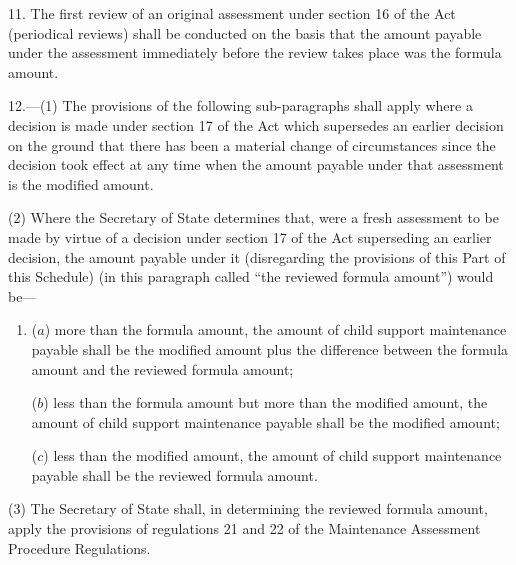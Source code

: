 \documentclass[12pt,a4paper]{article}
\begin{document}

\medskip

11.  The first review of an original assessment under section 16 of the Act (periodical reviews) shall be conducted on the basis that the amount payable under the assessment immediately before the review takes place was the formula amount.

\medskip

12.—(1) The provisions of the following sub-paragraphs shall apply where 
a decision is made under section 17 of the Act which supersedes an earlier decision on the ground that there has been a material change of circumstances since the decision took effect  %
at any time when the amount payable under that assessment is the modified amount.

(2) Where the 
Secretary of State determines that, were a fresh assessment to be made by virtue of a decision under section 17 of the Act superseding an earlier decision,  %
the amount payable under it (disregarding the provisions of this Part of this Schedule) (in this paragraph called “the reviewed formula amount”) would be—
\begin{enumerate}\item[]
($a$) more than the formula amount, the amount of child support maintenance payable shall be the modified amount plus the difference between the formula amount and the reviewed formula amount;

($b$) less than the formula amount but more than the modified amount, the amount of child support maintenance payable shall be the modified amount;

($c$) less than the modified amount, the amount of child support maintenance payable shall be the reviewed formula amount.
\end{enumerate}

(3) The 
Secretary of State  %
shall, in determining the reviewed formula amount, apply the provisions of regulations 
21 and  %
22 of the Maintenance Assessment Procedure Regulations.
\end{document}
